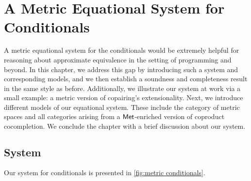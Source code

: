 \chapter{A Metric Equational System for Conditionals} \label{ch:conditionals}

A metric equational system for the conditionals would be extremely helpful for reasoning about approximate equivalence in the setting of programming and beyond.
In this chapter, we address this gap by introducing such a system and corresponding models, and we then establish a soundness and completeness result in the same style as before. Additionally, we illustrate our system at work via a small example: a metric version of copairing's extensionality. 
Next, we introduce different models of our equational system. These include the category of metric spaces and all categories arising from a $\mathsf{Met}$-enriched version of coproduct cocompletion. We conclude the chapter with a brief discussion about our system.






\section{System}

Our system for conditionals is presented in \autoref{fig:metric conditionals}. 


